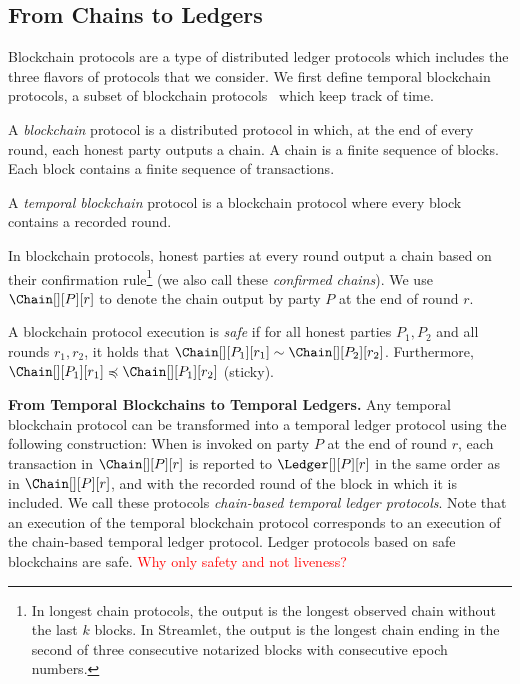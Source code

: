 \subsection{From Chains to Ledgers}

Blockchain protocols are a type of distributed ledger protocols which includes the three flavors of protocols that we consider.
We first define temporal blockchain protocols,
a subset of blockchain protocols~\cite{rethinking-consensus}
which keep track of time.

\begin{definition}
  A \emph{blockchain} protocol is a distributed protocol
  in which, at the end of every round, each honest party outputs
  a chain. A chain is a finite sequence of blocks. Each block
  contains a finite sequence of transactions.

  A \emph{temporal blockchain} protocol is a blockchain protocol
  where every block contains a recorded round.
\end{definition}

In blockchain protocols, honest parties at every round output a chain
based on their confirmation rule\footnote{
  In longest chain protocols, the output is the longest observed chain without the last $k$ blocks.
  In Streamlet, the output is the longest chain ending in the second of three consecutive notarized
  blocks with consecutive epoch numbers.
} (we also call these \emph{confirmed chains}).
We use $\Chain[][P][r]$ to denote the chain output
by party $P$ at the end of round $r$.

\begin{definition}
  A blockchain protocol execution is \emph{safe} if for
  all honest parties $P_1, P_2$ and all rounds $r_1, r_2$,
  it holds that $\Chain[][P_1][r_1] \sim \Chain[][P_2][r_2]$.
  Furthermore, $\Chain[][P_1][r_1] \preccurlyeq \Chain[][P_1][r_2]$ (sticky).
\end{definition}

\noindent
\textbf{From Temporal Blockchains to Temporal Ledgers.}
Any temporal blockchain protocol can be transformed into a
temporal ledger protocol using the following construction:
When \rread is invoked on party $P$ at the end of round $r$, each transaction in
$\Chain[][P][r]$ is reported to $\Ledger[][P][r]$ in the same order as in $\Chain[][P][r]$, and with
the recorded round of the block in which it is included.
We call these protocols \emph{chain-based temporal ledger protocols}.
Note that an execution of the temporal blockchain protocol corresponds to an execution of the chain-based temporal ledger protocol.
Ledger protocols based on safe blockchains are safe.
\textcolor{red}{Why only safety and not liveness?}

